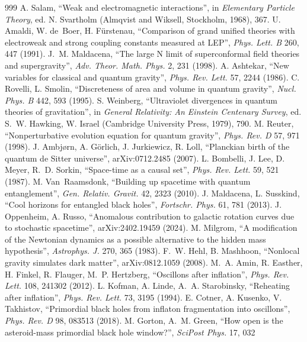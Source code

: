 \documentclass[11pt,a4paper]{article}
\theoremstyle{definition}
\theoremstyle{remark}
\theoremstyle{definition}
\begin{document}
\begin{thebibliography}{999}
 A. Salam, ``Weak and electromagnetic interactions'', in \emph{Elementary Particle Theory}, ed. N. Svartholm (Almqvist and
Wiksell, Stockholm, 1968), 367.
 U. Amaldi, W. de~Boer, H. F{\"u}rstenau, ``Comparison of grand unified theories with electroweak and strong coupling
constants measured at LEP'', \emph{Phys. Lett. B} 260, 447 (1991).
 J.~M. Maldacena, ``The large N limit of superconformal field theories and supergravity'', \emph{Adv. Theor. Math. Phys.}
2, 231 (1998).
 A. Ashtekar, ``New variables for classical and quantum gravity'', \emph{Phys. Rev. Lett.} 57, 2244 (1986).
 C. Rovelli, L. Smolin, ``Discreteness of area and volume in quantum gravity'', \emph{Nucl. Phys. B} 442, 593
(1995).
 S. Weinberg, ``Ultraviolet divergences in quantum theories of gravitation'', in \emph{General Relativity: An Einstein
Centenary Survey}, ed. S.~W. Hawking, W. Israel (Cambridge University Press, 1979), 790.
 M. Reuter, ``Nonperturbative evolution equation for quantum gravity'', \emph{Phys. Rev. D} 57, 971 (1998).
 J. Ambj{\o}rn, A. G{\"o}rlich, J. Jurkiewicz, R. Loll, ``Planckian birth of the quantum de Sitter universe'',
arXiv:0712.2485 (2007).
 L. Bombelli, J. Lee, D. Meyer, R.~D. Sorkin, ``Space-time as a causal set'', \emph{Phys. Rev. Lett.} 59, 521 (1987).
 M. Van~Raamsdonk, ``Building up spacetime with quantum entanglement'', \emph{Gen. Relativ. Gravit.} 42, 2323 (2010).
 J. Maldacena, L. Susskind, ``Cool horizons for entangled black holes'', \emph{Fortschr. Phys.} 61, 781 (2013).
 J. Oppenheim, A. Russo, ``Anomalous contribution to galactic rotation curves due to stochastic spacetime'',
arXiv:2402.19459 (2024).
 M. Milgrom, ``A modification of the Newtonian dynamics as a possible alternative to the hidden mass hypothesis'',
\emph{Astrophys. J.} 270, 365 (1983).
 F.~W. Hehl, B. Mashhoon, ``Nonlocal gravity simulates dark matter'', arXiv:0812.1059 (2008).
 M.~A. Amin, R. Easther, H. Finkel, R. Flauger, M.~P. Hertzberg, ``Oscillons after inflation'', \emph{Phys. Rev. Lett.} 108,
241302 (2012).
 L. Kofman, A. Linde, A.~A. Starobinsky, ``Reheating after inflation'', \emph{Phys. Rev. Lett.} 73, 3195 (1994).
 E. Cotner, A. Kusenko, V. Takhistov, ``Primordial black holes from inflaton fragmentation into oscillons'', \emph{Phys.
Rev. D} 98, 083513 (2018).
 M. Gorton, A.~M. Green, ``How open is the asteroid-mass primordial black hole window?'', \emph{SciPost Phys.} 17, 032

\end{thebibliography}
\end{document}
